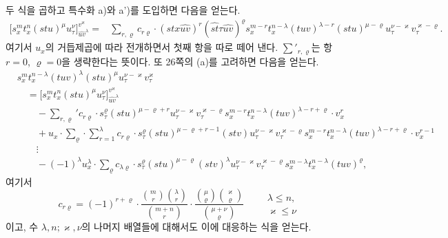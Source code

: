 
두 식을 곱하고 특수화 a)와 a')를 도입하면 다음을 얻는다.
\[
\begin{aligned}
\bigl[s_x^m t_x^n(stu)^\mu u_\tau^\nu\bigr]_{\widehat{uv}^{\lambda}}^{v^\varkappa}
={}&
\sum_{r,\varrho}c_{r\varrho}\cdot
(stx\widehat{uv})^r(\widehat{st}\tau\widehat{uv})^\varrho
s_x^{m-r}t_x^{n-\lambda}(tuv)^{\lambda-r}(stu)^{\mu-\varrho}
u_\tau^{\nu-\varkappa}v_\tau^{\varkappa-\varrho}.
\end{aligned}
\]
여기서 $u_x$의 거듭제곱에 따라 전개하면서 첫째 항을 따로 떼어 낸다. $\sum'_{r,\varrho}$는 항 $r=0$, $\varrho=0$을 생략한다는 뜻이다. 또 26쪽의 (a)를 고려하면 다음을 얻는다.
\[
\tag{II}
\begin{aligned}
&s_x^m t_x^{n-\lambda}(tuv)^\lambda(stu)^\mu u_\tau^{\nu-\varkappa}v_\tau^\varkappa\\
&\quad =
\bigl[s_x^m t_x^n(stu)^\mu u_\tau^\nu\bigr]_{\widehat{uv}^{\lambda}}^{v^\varkappa}\\
&\qquad
-\sum_{r,\varrho}' c_{r\varrho}\cdot s_\tau^\varrho(stu)^{\mu-\varrho+r}
u_\tau^{\nu-\varkappa}v_\tau^{\varkappa-\varrho}
s_x^{m-r}t_x^{n-\lambda}(tuv)^{\lambda-r+\varrho}\cdot v_x^r\\
&\qquad
+u_x\cdot\sum_{\varrho}\cdot\sum_{r=1}^{\lambda} c_{r\varrho}\cdot
s_\tau^\varrho(stu)^{\mu-\varrho+r-1}(stv)
u_\tau^{\nu-\varkappa}v_\tau^{\varkappa-\varrho}
s_x^{m-r}t_x^{n-\lambda}(tuv)^{\lambda-r+\varrho}\cdot v_x^{r-1}\\
&\qquad
\vdots\\
&\qquad
-(-1)^\lambda u_x^\lambda\cdot\sum_\varrho c_{\lambda\varrho}\cdot
s_\tau^\varrho(stu)^{\mu-\varrho}(stv)^\lambda
u_\tau^{\nu-\varkappa}v_\tau^{\varkappa-\varrho}
s_x^{m-\lambda}t_x^{n-\lambda}(tuv)^\varrho,
\end{aligned}
\]
여기서
\[
c_{r\varrho}=(-1)^{r+\varrho}\cdot
\frac{\binom{m}{r}\binom{\lambda}{r}}{\binom{m+n}{r}}\cdot
\frac{\binom{\mu}{\varrho}\binom{\varkappa}{\varrho}}{\binom{\mu+\nu}{\varrho}}
\qquad
\begin{array}{l}
\lambda\le n,\\
\varkappa\le\nu
\end{array}
\]
이고, 수 $\lambda,n;\varkappa,\nu$의 나머지 배열들에 대해서도 이에 대응하는 식을 얻는다.

